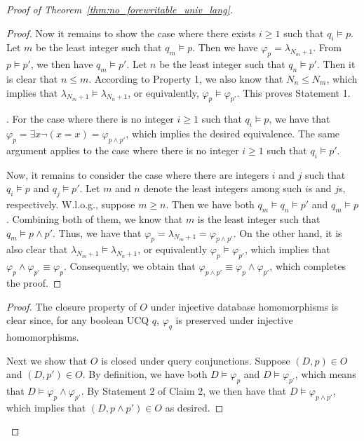 \documentclass[letterpaper]{article} %
\theoremstyle{definition}
\theoremstyle{remark}
\theoremstyle{definition}
\begin{document}
\begin{proof}[Proof of Theorem~\ref{thm:no_forewritable_univ_lang}]
\begin{proof}
Now it remains to show the case where there exists $i\ge 1$ such that $q_i\vDash p$. Let $m$ be the least integer such that $q_m\vDash p$. Then we have $\varphi_p=\lambda_{N_m+1}$. From $p\vDash p'$, we then have $q_m\vDash p'$. Let $n$ be the least integer such that $q_n\vDash p'$. Then it is clear that $n\le m$. According to Property 1, we also know that $N_n\le N_m$, which implies that $\lambda_{N_m+1}\vDash\lambda_{N_n+1}$, or equivalently, $\varphi_{p}\vDash\varphi_{p'}$. This proves Statement 1.

. For the case where there is no integer $i\ge 1$ such that $q_i\vDash p$, we have that
$\varphi_{p}=\exists x\neg(x=x)=\varphi_{p\wedge p'}$, 
which implies the desired equivalence. The same argument applies to the case where there is no integer $i\ge 1$ such that $q_i\vDash p'$.

Now, it remains to consider the case where there are integers $i$ and $j$ such that $q_i\vDash p$ and $q_j\vDash p'$. Let $m$ and $n$ denote the least integers among such $i$s and $j$s, respectively. W.l.o.g., suppose $m\ge n$. Then we have both $q_m\vDash q_n\vDash p'$ and $q_m\vDash p$. Combining both of them, we know that $m$ is the least integer such that $q_m\vDash p\wedge p'$. Thus, we have that $\varphi_p=\lambda_{N_m+1}=\varphi_{p\wedge p'}$. On the other hand, it is also clear that $\lambda_{N_m+1}\vDash\lambda_{N_n+1}$, or equivalently $\varphi_p\vDash\varphi_{p'}$, which implies that $\varphi_p\wedge\varphi_{p'}\equiv\varphi_p$. Consequently, we obtain that $\varphi_{p\wedge p'}\equiv \varphi_p\wedge\varphi_{p'}$, which completes the proof.
\end{proof}


\medskip
{}

\begin{proof}
The closure property of $O$ under injective database homomorphisms is clear since, for any boolean UCQ $q$, $\varphi_q$ is preserved under injective homomorphisms.

Next we show that $O$ is closed under query conjunctions. Suppose $(D,p)\in O$ and $(D,p')\in O$. By definition, we have both $D\models\varphi_p$ and $D\models\varphi_{p'}$, which means that $D\models\varphi_p\wedge\varphi_{p'}$. By Statement 2 of Claim 2, we then have that $D\models\varphi_{p\wedge p'}$, which implies that $(D,p\wedge p')\in O$ as desired.


\end{proof}
\end{proof}
\end{document}
